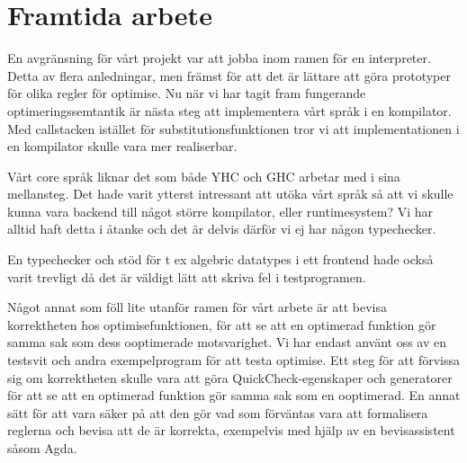\documentclass[Rapport]{subfiles}
\begin{document}
\section{Framtida arbete}

En avgränsning för vårt projekt var att jobba inom ramen för en interpreter. 
Detta av flera anledningar, men främst för att det är lättare att göra prototyper för 
olika regler för optimise. Nu när vi har tagit fram fungerande optimeringssemtantik 
är nästa steg att implementera vårt språk i en kompilator.
Med callstacken istället för substitutionsfunktionen tror vi att implementationen
i en kompilator skulle vara mer realiserbar.


Vårt core språk liknar det som både YHC och GHC arbetar med i sina mellansteg.
Det hade varit ytterst intressant att utöka vårt språk så att vi skulle kunna 
vara backend till något större kompilator, eller runtimesystem?
Vi har alltid haft detta i åtanke och det är delvis därför vi ej har någon 
typechecker.




En typechecker och stöd för t ex algebric datatypes i ett frontend hade också
varit trevligt då det är väldigt lätt att skriva fel i testprogramen. 


Något annat som föll lite utanför ramen för vårt arbete är att bevisa
korrektheten hos optimisefunktionen, för att se att en optimerad funktion
gör samma sak som dess ooptimerade motsvarighet. Vi har endast använt oss av en testsvit
och andra exempelprogram för att testa optimise. Ett steg för att förvissa sig
om korrektheten skulle vara att göra QuickCheck-egenskaper och generatorer för att se
att en optimerad funktion gör samma sak som en ooptimerad. En annat sätt för att vara säker på att den
gör vad som förväntas vara att formalisera reglerna och bevisa
att de är korrekta, exempelvis med hjälp av en bevisassistent såsom Agda.


\end{document}

